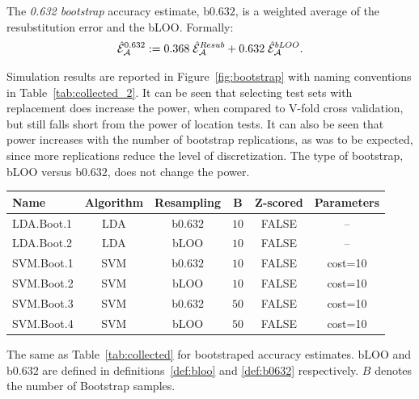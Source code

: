 \documentclass[12pt,a4paper]{article}
\begin{document}
\begin{definition}[b$0.632$]
	\label{def:b0632}
	The \emph{0.632 bootstrap} accuracy estimate, b$0.632$, is a weighted average of the resubstitution error and the bLOO.
	Formally:
	\begin{align}
	\hat{\mathcal{E}}_{\mathcal{A}}^{0.632} := 0.368 \; \hat{\mathcal{E}}_{\mathcal{A}}^{Resub}  + 0.632 \; \hat{\mathcal{E}}_{\mathcal{A}}^{bLOO}.
	\end{align}
\end{definition}
Simulation results are reported in Figure~\ref{fig:bootstrap} with naming conventions in Table~\ref{tab:collected_2}.
It can be seen that selecting test sets with replacement does increase the power, when compared to V-fold cross validation, but still falls short from the power of location tests. 
It can also be seen that power increases with the number of bootstrap replications, as was to be expected, since more replications reduce the level of discretization.
The type of bootstrap, bLOO versus b$0.632$, does not change the power. 

\bigskip

\begin{tcolorbox}
	\centering
	\begin{tabular}{l|c|c|c|c|c}
		Name & Algorithm & Resampling & B & Z-scored & Parameters\\ 
		\hline
		\hline
		LDA.Boot.1 & LDA & b$0.632$ & $10$ & FALSE &  -- \\ 
		LDA.Boot.2 & LDA & bLOO 	& $10$ & FALSE &  -- \\ 
		SVM.Boot.1 & SVM & b$0.632$ & $10$ & FALSE & cost=10 \\ 
		SVM.Boot.2 & SVM & bLOO 	& $10$ & FALSE & cost=10 \\ 
		SVM.Boot.3 & SVM & b$0.632$ & $50$ & FALSE & cost=10 \\ 
		SVM.Boot.4 & SVM & bLOO 	& $50$ & FALSE & cost=10 \\ 
	\end{tabular} 
	\captionsetup{type=table}
	\caption{
		The same as Table~\ref{tab:collected} for bootstraped accuracy estimates. 
		bLOO and b$0.632$ are defined in definitions~\ref{def:bloo} and \ref{def:b0632} respectively.
		$B$ denotes the number of Bootstrap samples. } 
	\label{tab:collected_2}
\end{tcolorbox}
\end{document}
